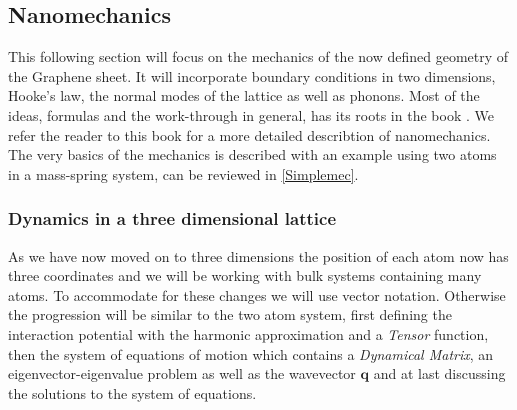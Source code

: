 
\subsection{Nanomechanics}
This following section will focus on the mechanics of the now defined geometry of the Graphene sheet. It will incorporate boundary conditions in two dimensions, Hooke's law, the normal modes of the lattice as well as phonons. Most of the ideas, formulas and the work-through in general, has its roots in the book . We refer the reader to this book for a more detailed describtion of nanomechanics. The very basics of the mechanics is described with an example using two atoms in a mass-spring system, can be reviewed in \cref{Simplemec}. 
\subsubsection{Dynamics in a three dimensional lattice} As we have now moved on to three dimensions the position of each atom now has three coordinates and we will be working with bulk systems containing many atoms. To accommodate for these changes we will use vector notation. Otherwise the progression will be similar to the two atom system, first defining the interaction potential with the harmonic approximation and a \textit{Tensor} function, then the system of equations of motion which contains a \textit{Dynamical Matrix}, an eigenvector-eigenvalue problem as well as the wavevector $\textbf{q}$ and at last discussing the solutions to the system of equations.\\
